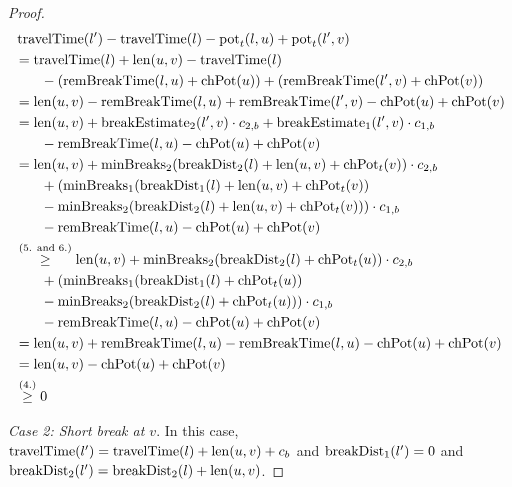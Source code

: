 \begin{proof}
	\begin{align}
		\begin{split}\label{eq:label_n_feasibility_proof_1}
			&\concretett(l') - \concretett(l) - \concretepotential_t(l,u) + \concretepotential_t(l',v)\\
			&= \concretett(l) + \len(u,v) - \concretett(l)\\
			& \phantom{{}=1} - (\remBreak(l,u) + \chpotential(u)) + (\remBreak(l',v) + \chpotential(v))\\
			&= \len(u,v) - \remBreak(l,u) + \remBreak(l',v) - \chpotential(u) + \chpotential(v)\\
			&= \len(u,v) + \breakEstimate_2(l',v) \cdot \restr_{2,b} + \breakEstimate_1(l',v) \cdot \restr_{1,b}\\
			& \phantom{{}=1} - \remBreak(l,u) - \chpotential(u) + \chpotential(v)\\
			&= \len(u,v) + \minBreaks_2(\breakDist_2(l) + \len(u,v) + \chpotential_t(v)) \cdot \restr_{2,b}\\
			& \phantom{{}=1} + (\minBreaks_1(\breakDist_1(l) + \len(u,v) + \chpotential_t(v))\\
			& \phantom{{}=1} - \minBreaks_2(\breakDist_2(l) + \len(u,v) + \chpotential_t(v))) \cdot \restr_{1,b}\\
			& \phantom{{}=1} - \remBreak(l,u) - \chpotential(u) + \chpotential(v)\\
			&\stackrel{\text{(5. and 6.)}}{\ge} \len(u,v)  + \minBreaks_2(\breakDist_2(l) + \chpotential_t(u)) \cdot \restr_{2,b}\\
			& \phantom{{}=1} + (\minBreaks_1(\breakDist_1(l) + \chpotential_t(u))\\
			& \phantom{{}=1} - \minBreaks_2(\breakDist_2(l) + \chpotential_t(u))) \cdot \restr_{1,b}\\
			& \phantom{{}=1} - \remBreak(l,u) - \chpotential(u) + \chpotential(v)\\
			&= \len(u,v) +  \remBreak(l,u) - \remBreak(l,u) - \chpotential(u) + \chpotential(v)\\
			&= \len(u,v) - \chpotential(u) + \chpotential(v)\\
			&\stackrel{\text{(4.)}}{\ge} 0
		\end{split}
	\end{align}

	\emph{Case 2: Short break at $v$}. In this case, $\operatorname{travelTime}(l') = \operatorname{travelTime}(l) + \operatorname{len}(u,v) + c_b$ and $\operatorname{breakDist}_1(l') = 0$ and $\operatorname{breakDist}_2(l') = \operatorname{breakDist}_2(l) + \operatorname{len}(u,v)$.


\end{proof}
